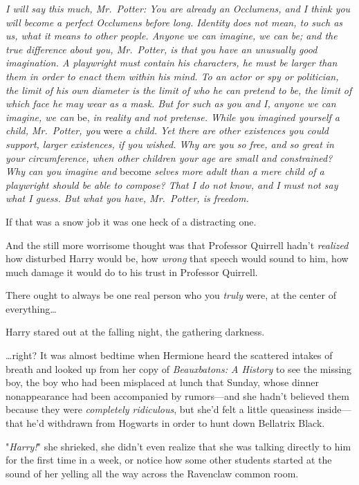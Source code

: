 \emph{I will say this much, Mr.~Potter: You are already an Occlumens, and I 
think you will become a perfect Occlumens before long. Identity does not mean, 
to such as us, what it means to other people. Anyone we can imagine, we can be; 
and the true difference about you, Mr.~Potter, is that you have an unusually 
good imagination. A playwright must contain his characters, he must be larger 
than them in order to enact them within his mind. To an actor or spy or 
politician, the limit of his own diameter is the limit of who he can pretend to 
be, the limit of which face he may wear as a mask. But for such as you and I, 
anyone we can imagine, we can} be, \emph{in reality and not pretense. While you 
imagined yourself a child, Mr.~Potter, you} were \emph{a child. Yet there are 
other existences you could support, larger existences, if you wished. Why are 
you so free, and so great in your circumference, when other children your age 
are small and constrained? Why can you imagine and} become \emph{selves more 
adult than a mere child of a playwright should be able to compose? That I do 
not know, and I must not say what I guess. But what you have, Mr.~Potter, is 
freedom.}

If that was a snow job it was one heck of a distracting one.

And the still more worrisome thought was that Professor Quirrell hadn't 
\emph{realized} how disturbed Harry would be, how \emph{wrong} that speech 
would sound to him, how much damage it would do to his trust in Professor 
Quirrell.

There ought to always be one real person who you \emph{truly} were, at the 
center of everything{\ldots}

Harry stared out at the falling night, the gathering darkness.

{\ldots}right?
\sbreak
It was almost bedtime when Hermione heard the scattered intakes of breath and 
looked up from her copy of \emph{Beauxbatons: A History} to see the missing 
boy, the boy who had been misplaced at lunch that Sunday, whose dinner 
nonappearance had been accompanied by rumors---and she hadn't believed them 
because they were \emph{completely ridiculous}, but she'd felt a little 
queasiness inside---that he'd withdrawn from Hogwarts in order to hunt down 
Bellatrix Black.

"\emph{Harry!}" she shrieked, she didn't even realize that she was talking 
directly to him for the first time in a week, or notice how some other students 
started at the sound of her yelling all the way across the Ravenclaw common 
room.

